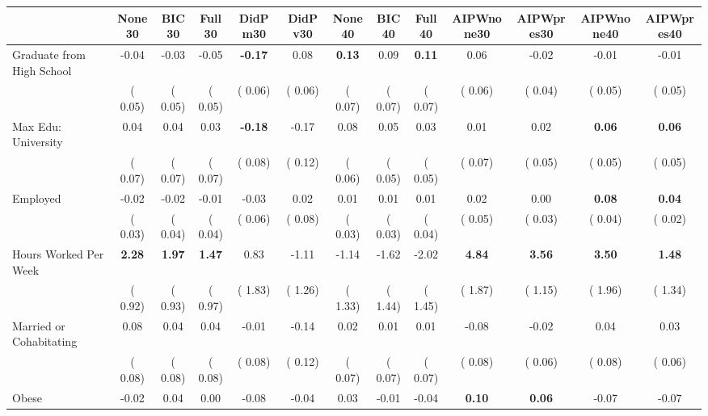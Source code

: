 \begin{tabular}{l c c c c c c c c c c c c}
\toprule
 & None30 & BIC30 & Full30 & DidPm30 & DidPv30 & None40 & BIC40 & Full40 & AIPWnone30 & AIPWpres30 & AIPWnone40 & AIPWpres40 \\
\midrule
Graduate from High School &     -0.04 &     -0.03 &     -0.05 & \textbf{     -0.17 } &      0.08 & \textbf{      0.13 } &      0.09 & \textbf{      0.11 } &      0.06 &     -0.02 &     -0.01 &     -0.01 \\
& (     0.05) & (     0.05) & (     0.05) & (     0.06) & (     0.06) & (     0.07) & (     0.07) & (     0.07) & (     0.06) & (     0.04) & (     0.05) & (     0.05) \\
Max Edu: University &      0.04 &      0.04 &      0.03 & \textbf{     -0.18 } &     -0.17 &      0.08 &      0.05 &      0.03 &      0.01 &      0.02 & \textbf{     0.06} & \textbf{     0.06} \\
& (     0.07) & (     0.07) & (     0.07) & (     0.08) & (     0.12) & (     0.06) & (     0.05) & (     0.05) & (     0.07) & (     0.05) & (     0.05) & (     0.05) \\
Employed &     -0.02 &     -0.02 &     -0.01 &     -0.03 &      0.02 &      0.01 &      0.01 &      0.01 &      0.02 &      0.00 & \textbf{     0.08} & \textbf{     0.04} \\
& (     0.03) & (     0.04) & (     0.04) & (     0.06) & (     0.08) & (     0.03) & (     0.03) & (     0.04) & (     0.05) & (     0.03) & (     0.04) & (     0.02) \\
Hours Worked Per Week & \textbf{      2.28 } & \textbf{      1.97 } & \textbf{      1.47 } &      0.83 &     -1.11 &     -1.14 &     -1.62 &     -2.02 & \textbf{     4.84} & \textbf{     3.56} & \textbf{     3.50} & \textbf{     1.48} \\
& (     0.92) & (     0.93) & (     0.97) & (     1.83) & (     1.26) & (     1.33) & (     1.44) & (     1.45) & (     1.87) & (     1.15) & (     1.96) & (     1.34) \\
Married or Cohabitating &      0.08 &      0.04 &      0.04 &     -0.01 &     -0.14 &      0.02 &      0.01 &      0.01 &     -0.08 &     -0.02 &      0.04 &      0.03 \\
& (     0.08) & (     0.08) & (     0.08) & (     0.08) & (     0.12) & (     0.07) & (     0.07) & (     0.07) & (     0.08) & (     0.06) & (     0.08) & (     0.06) \\
Obese &     -0.02 &      0.04 &      0.00 &     -0.08 &     -0.04 &      0.03 &     -0.01 &     -0.04 & \textbf{     0.10} & \textbf{     0.06} &     -0.07 &     -0.07 \\

\end{tabular}
